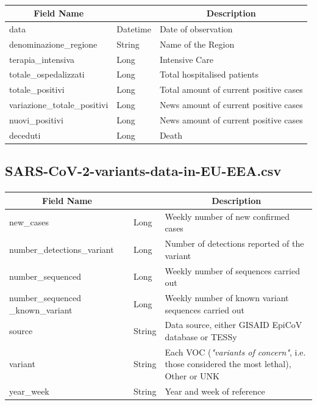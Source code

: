 \documentclass[a4paper,12pt]{article}
\begin{document}
\paragraph{}
\begin{center}
\begin{tabular}{|m{45mm}|>{\raggedright}m{16mm}|m{75mm}|}
\hline
\multicolumn{1}{|c|}{\textbf{ Field Name }}
& \multicolumn{1}{c|}{\textbf{ Data Type }} 
    	& \multicolumn{1}{c|}{\textbf{ Description }}\\
\hline
data & Datetime & Date of observation \\
\hline
denominazione\_regione & String & Name of the Region \\
\hline
terapia\_intensiva & Long & Intensive Care \\
\hline
totale\_ospedalizzati & Long & Total hospitalised patients \\
\hline
totale\_positivi & Long & Total amount of current positive cases \\
\hline
variazione\_totale\_positivi & Long & News amount of current positive cases \\
\hline
nuovi\_positivi & Long & News amount of current positive cases \\
\hline
deceduti & Long & Death \\
\hline
\end{tabular}
\end{center}

\newpage
\subsection{SARS-CoV-2-variants-data-in-EU-EEA.csv}
\paragraph{}
\begin{center}
\begin{tabular}{|m{45mm}|>{\raggedright}m{16mm}|m{75mm}|}
\hline
\multicolumn{1}{|c|}{\textbf{ Field Name }}
& \multicolumn{1}{c|}{\textbf{ Data Type }} 
    	& \multicolumn{1}{c|}{\textbf{ Description }}\\
\hline
new\_cases & Long & Weekly number of new confirmed cases \\
\hline
number\_detections\_variant & Long & Number of detections reported of the variant \\
\hline
number\_sequenced & Long & Weekly number of sequences carried out \\
\hline
number\_sequenced \_known\_variant & Long & Weekly number of known variant sequences carried out \\
\hline
source & String & Data source, either GISAID EpiCoV database or TESSy \\
\hline
variant & String & Each VOC (\emph{"variants of concern"}, i.e. those considered the most lethal), Other or UNK \\
\hline
year\_week & String & Year and week of reference \\
\hline
\end{tabular}
\end{center}
\end{document}
